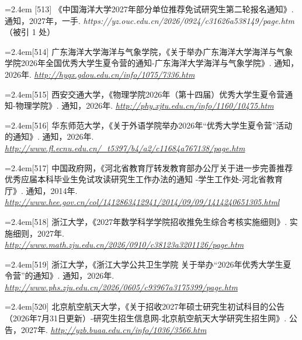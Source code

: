 {\vspace{0.6pt}
\noindent\hangindent=2.4em \label{src:S0760}{\color{cAccent}[513]} 《中国海洋大学2027年部分单位推荐免试研究生第二轮报名通知》. 通知，2027年，一手. \textit{https://yz.ouc.edu.cn/2026/0924/c31626a538149/page.htm}（被引 1 处）\par
\vspace{0.6pt}
\par\noindent\hangindent=2.4em\label{src:S0008}{\color{cAccent}[514]} 广东海洋大学海洋与气象学院，《关于举办广东海洋大学海洋与气象学院2026年全国优秀大学生夏令营的通知-广东海洋大学海洋与气象学院》. 通知，2026年. \textit{\url{http://hyqx.gdou.edu.cn/info/1075/7336.htm}}\par
\par\noindent\hangindent=2.4em\label{src:S0015}{\color{cAccent}[515]} 西安交通大学，《物理学院2026年（第十四届）优秀大学生夏令营通知-物理学院》. 通知，2026年. \textit{\url{http://phy.xjtu.edu.cn/info/1160/10475.htm}}\par
\par\noindent\hangindent=2.4em\label{src:S0030}{\color{cAccent}[516]} 华东师范大学，《关于外语学院举办2026年“优秀大学生夏令营”活动的通知》. 通知，2026年. \textit{\url{http://www.fl.ecnu.edu.cn/_t5397/b4/a2/c11684a767138/page.htm}}\par
\par\noindent\hangindent=2.4em\label{src:S0033}{\color{cAccent}[517]} 中国政府网，《河北省教育厅转发教育部办公厅关于进一步完善推荐优秀应届本科毕业生免试攻读研究生工作办法的通知
-学生工作处-河北省教育厅》. 通知，2014年. \textit{\url{http://www.hee.gov.cn/col/1412863412941/2014/09/09/1414240651305.html}}\par
\par\noindent\hangindent=2.4em\label{src:S0038}{\color{cAccent}[518]} 浙江大学，《2027年数学科学学院招收推免生综合考核实施细则》. 实施细则，2027年. \textit{\url{http://www.math.zju.edu.cn/2026/0910/c38123a3201126/page.htm}}\par
\par\noindent\hangindent=2.4em\label{src:S0055}{\color{cAccent}[519]} 浙江大学，《浙江大学公共卫生学院 关于举办“2026年优秀大学生夏令营”的通知》. 通知，2026年. \textit{\url{http://www.phs.zju.edu.cn/2026/0605/c93967a3175399/page.htm}}\par
\par\noindent\hangindent=2.4em\label{src:S0062}{\color{cAccent}[520]} 北京航空航天大学，《关于招收2027年硕士研究生初试科目的公告（2026年7月31日更新）-研究生招生信息网-北京航空航天大学研究生招生网》. 公告，2027年. \textit{\url{http://yzb.buaa.edu.cn/info/1036/3566.htm}}\par
}

